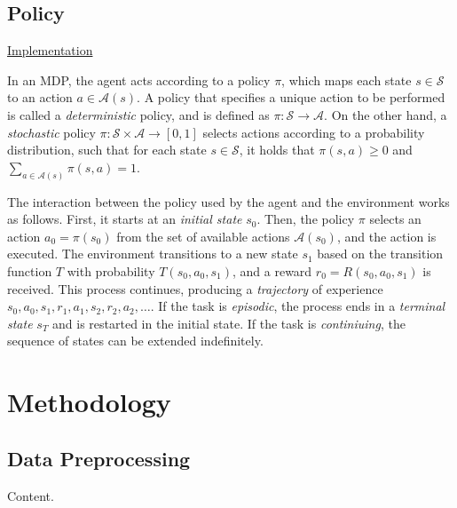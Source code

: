 \documentclass{article}
\begin{document}
\subsection{Policy}

\noindent
\href{https://github.com/davidrobles/mlnd-capstone-code/blob/master/capstone/policy/policy.py}
     {Implementation}
\break

In an MDP, the agent acts according to a policy $\pi$, which maps each state $s \in \mathcal{S}$ to
an action $a \in \mathcal{A}(s)$. A policy that specifies a unique action to be performed is called
a \emph{deterministic} policy, and is defined as $\pi : \mathcal{S} \rightarrow \mathcal{A}$. On the
other hand, a \emph{stochastic} policy $\pi : \mathcal{S} \times \mathcal{A} \rightarrow [0,1]$
selects actions according to a probability distribution, such that for each state $s \in
\mathcal{S}$, it holds that $\pi(s,a) \geq 0$ and $\sum_{a\in\mathcal{A}(s)} \pi(s,a) = 1$.

The interaction between the policy used by the agent and the environment works as follows. First, it
starts at an \emph{initial state} $s_0$. Then, the policy $\pi$ selects an action $a_0 = \pi(s_0)$
from the set of available actions $\mathcal{A}(s_0)$, and the action is executed. The environment
transitions to a new state $s_1$ based on the transition function $T$ with probability
$T(s_0,a_0,s_1)$, and a reward $r_0 = R(s_0, a_0, s_1)$ is received. This process continues,
producing a \emph{trajectory} of experience $s_0, a_0, s_1, r_1, a_1, s_2, r_2, a_2, \dots$. If the
task is \emph{episodic}, the process ends in a \emph{terminal state} $s_T$ and is restarted in the
initial state. If the task is \emph{continiuing}, the sequence of states can be extended
indefinitely.

\section{Methodology}

\subsection{Data Preprocessing}

Content.
\end{document}
